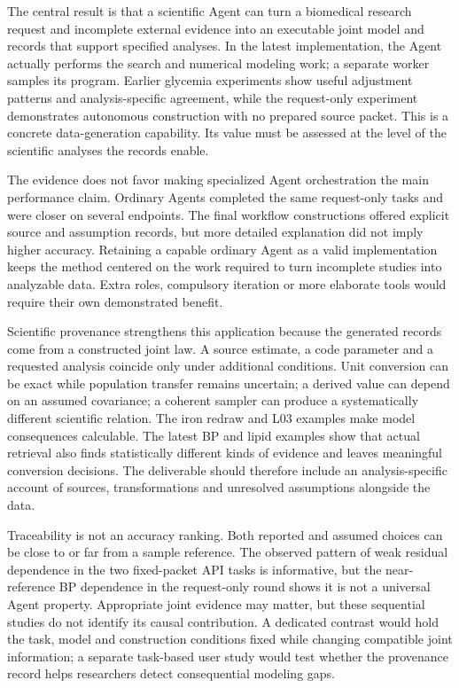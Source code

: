 \documentclass[11pt,letterpaper]{article}
\begin{document}
The central result is that a scientific Agent can turn a biomedical research request and incomplete external evidence into an executable joint model and records that support specified analyses. In the latest implementation, the Agent actually performs the search and numerical modeling work; a separate worker samples its program. Earlier glycemia experiments show useful adjustment patterns and analysis-specific agreement, while the request-only experiment demonstrates autonomous construction with no prepared source packet. This is a concrete data-generation capability. Its value must be assessed at the level of the scientific analyses the records enable.


The evidence does not favor making specialized Agent orchestration the main performance claim. Ordinary Agents completed the same request-only tasks and were closer on several endpoints. The final workflow constructions offered explicit source and assumption records, but more detailed explanation did not imply higher accuracy. Retaining a capable ordinary Agent as a valid implementation keeps the method centered on the work required to turn incomplete studies into analyzable data. Extra roles, compulsory iteration or more elaborate tools would require their own demonstrated benefit.


Scientific provenance strengthens this application because the generated records come from a constructed joint law. A source estimate, a code parameter and a requested analysis coincide only under additional conditions. Unit conversion can be exact while population transfer remains uncertain; a derived value can depend on an assumed covariance; a coherent sampler can produce a systematically different scientific relation. The iron redraw and L03 examples make model consequences calculable. The latest BP and lipid examples show that actual retrieval also finds statistically different kinds of evidence and leaves meaningful conversion decisions. The deliverable should therefore include an analysis-specific account of sources, transformations and unresolved assumptions alongside the data.


Traceability is not an accuracy ranking. Both reported and assumed choices can be close to or far from a sample reference. The observed pattern of weak residual dependence in the two fixed-packet API tasks is informative, but the near-reference BP dependence in the request-only round shows it is not a universal Agent property. Appropriate joint evidence may matter, but these sequential studies do not identify its causal contribution. A dedicated contrast would hold the task, model and construction conditions fixed while changing compatible joint information; a separate task-based user study would test whether the provenance record helps researchers detect consequential modeling gaps.
\end{document}
